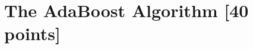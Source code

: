 \problem[7]
\begin{solution}
\end{solution}
\newpage


\problem[4]
\begin{solution}
\end{solution}
\newpage


\indent\problem[2] %
\begin{solution}
\end{solution}
\newpage


\problem[2]
\begin{solution}
\end{solution}
\newpage


\problem[4]
\begin{solution}
\end{solution}
\newpage


\problem[4]
\begin{solution}
\end{solution}
\newpage





\newpage
\section{The AdaBoost Algorithm [40 points]}

\problem[3]
\begin{solution}
\end{solution}
\newpage


\problem[3]
\begin{solution}
\end{solution}
\newpage



\problem[2]
\begin{solution}
\end{solution}
\newpage



\problem[5]
\begin{solution}
\end{solution}
\newpage


\problem[5]
\begin{solution}
\end{solution}
\newpage



\problem[2]
\begin{solution}
\end{solution}
\newpage



\problem[14]
\begin{solution}
\end{solution}
\newpage


\problem[2]
\begin{solution}
\end{solution}
\newpage


\problem[2]
\begin{solution}
\end{solution}
\newpage


\problem[2]
\begin{solution}
\end{solution}
\newpage




